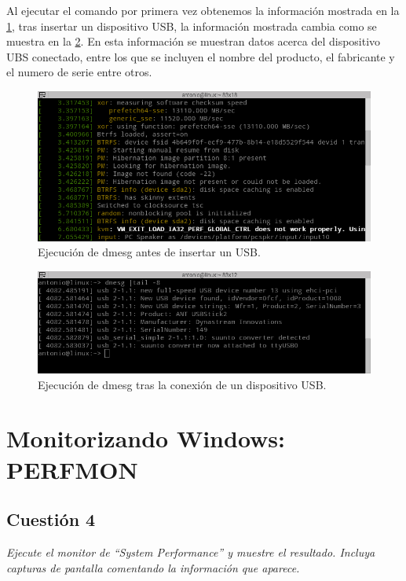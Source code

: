 Al ejecutar el comando por primera vez obtenemos la información mostrada en la  \cref{fig2}, tras insertar un dispositivo USB, la información mostrada cambia como se muestra en la  \cref{fig3}. En esta información se muestran datos acerca del dispositivo UBS conectado, entre los que se incluyen el nombre del producto, el fabricante y el numero de serie entre otros.
\begin{figure}[H]
  \begin{center}
    \includegraphics[width=1\textwidth]{imagenes/dmesg1}
    \caption{Ejecución de dmesg antes de insertar un USB.}
    \label{fig2}
  \end{center}
\end{figure}
\begin{figure}[H]
  \begin{center}
    \includegraphics[width=1\textwidth]{imagenes/dmesg2}
    \caption{Ejecución de dmesg tras la conexión de un dispositivo USB.}
    \label{fig3}
  \end{center}
\end{figure}

\section{Monitorizando Windows: PERFMON}
\subsection{Cuestión 4}
\textit{Ejecute el monitor de ``System Performance'' y muestre el resultado. Incluya capturas de pantalla comentando la información que aparece.}
\newline

